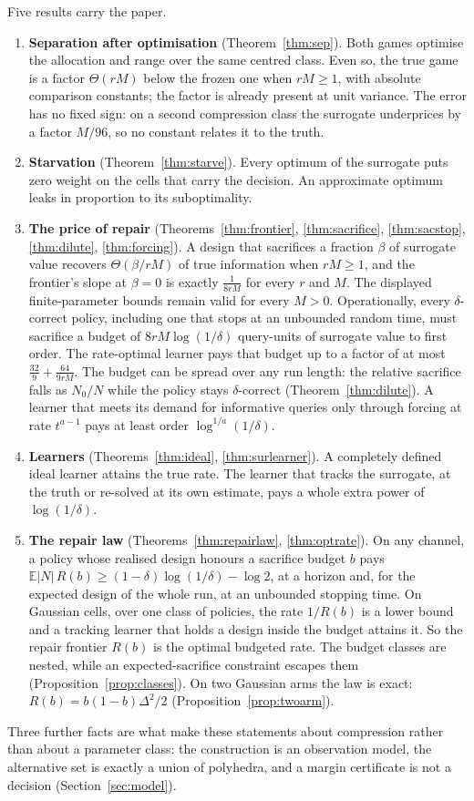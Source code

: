 Five results carry the paper.
\begin{enumerate}
\item[1)] \textbf{Separation after optimisation} (Theorem~\ref{thm:sep}). Both games optimise
the allocation and range over the same centred class. Even so, the true game is a factor
$\Theta(rM)$ below the frozen one when $rM\ge1$, with absolute comparison constants; the factor is already present at unit variance. The
error has no fixed sign: on a second compression class the surrogate underprices by a factor
$M/96$, so no constant relates it to the truth.
\item[2)] \textbf{Starvation} (Theorem~\ref{thm:starve}). Every optimum of the surrogate puts
zero weight on the cells that carry the decision. An approximate optimum leaks in proportion
to its suboptimality.
\item[3)] \textbf{The price of repair} (Theorems~\ref{thm:frontier}, \ref{thm:sacrifice},
\ref{thm:sacstop}, \ref{thm:dilute}, \ref{thm:forcing}). A design that sacrifices a fraction
$\beta$ of surrogate value recovers $\Theta(\beta/rM)$ of true information when $rM\ge1$, and
the frontier's slope at $\beta=0$ is exactly $\frac{1}{8rM}$ for every $r$ and $M$. The displayed finite-parameter bounds remain valid for every $M>0$. Operationally, every
$\delta$-correct policy, including one that stops at an unbounded random time, must sacrifice a
budget of $8rM\log(1/\delta)$ query-units of surrogate value to first order. The rate-optimal
learner pays that budget up to a factor of at most $\frac{32}{9}+\frac{64}{9rM}$.
The budget can be spread over any run length: the relative sacrifice falls as $N_{0}/N$ while
the policy stays $\delta$-correct (Theorem~\ref{thm:dilute}).
A learner that meets its demand for informative queries only through forcing at rate
$t^{a-1}$ pays at least order $\log^{1/a}(1/\delta)$.
\item[4)] \textbf{Learners} (Theorems~\ref{thm:ideal}, \ref{thm:surlearner}). A completely
defined ideal learner attains the true rate. The learner that tracks the surrogate, at the
truth or re-solved at its own estimate, pays a whole extra power of $\log(1/\delta)$.
\item[5)] \textbf{The repair law} (Theorems~\ref{thm:repairlaw}, \ref{thm:optrate}). On any
channel, a policy whose realised design honours a sacrifice budget $b$ pays
$\mathbb E|N|\,R(b)\ge(1-\delta)\log(1/\delta)-\log2$, at a horizon and, for the expected
design of the whole run, at an unbounded stopping time. On Gaussian cells, over one class of
policies, the rate $1/R(b)$ is a lower bound and a tracking learner that holds a design inside
the budget attains it. So the repair frontier $R(b)$ is the optimal budgeted rate. The budget classes are nested, while an
expected-sacrifice constraint escapes them (Proposition~\ref{prop:classes}). On two Gaussian
arms the law is exact: $R(b)=b(1-b)\Delta^2/2$ (Proposition~\ref{prop:twoarm}).
\end{enumerate}
Three further facts are what make these statements about compression rather than about a
parameter class: the construction is an observation model, the alternative set is exactly a
union of polyhedra, and a margin certificate is not a decision (Section~\ref{sec:model}).

